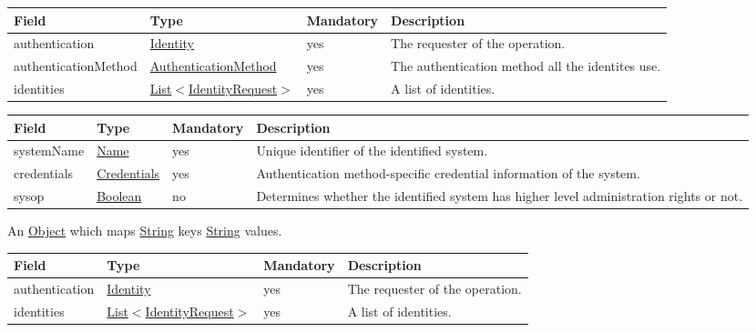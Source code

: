 \documentclass[a4paper]{arrowhead}
\newcommand{\pref}[1]{{\textcolor{ArrowheadGrey}{\hyperref[sec:model:primitives:#1]{#1}}}}
\begin{document}
\begin{table}[ht!]
\begin{tabularx}{\textwidth}{| p{3.3cm} | p{3.4cm} | p{2cm} | X |} \hline
\rowcolor{gray!33} Field & Type & Mandatory & Description \\ \hline
authentication & \hyperref[sec:model:Identity]{Identity} & yes & The requester of the operation. \\ \hline
authenticationMethod & \pref{AuthenticationMethod} & yes & The authentication method all the identites use. \\ \hline
identities & \pref{List}$<$\hyperref[sec:model:IdentityRequest]{IdentityRequest}$>$ & yes & A list of identities. \\ \hline
\end{tabularx}
\end{table}

\clearpage

 
\begin{table}[ht!]
\begin{tabularx}{\textwidth}{| p{2.5cm} | p{2.5cm} | p{2cm} | X |} \hline
\rowcolor{gray!33} Field & Type & Mandatory & Description \\ \hline
systemName & \pref{Name} & yes & Unique identifier of the identified system. \\ \hline
credentials &\hyperref[sec:model:Credentials]{Credentials} & yes & Authentication method-specific credential information of the system. \\ \hline
sysop & \pref{Boolean} & no & Determines whether the identified system has higher level administration rights or not. \\ \hline
\end{tabularx}
\end{table}


An \pref{Object} which maps \pref{String} keys \pref{String} values.

 
\begin{table}[ht!]
\begin{tabularx}{\textwidth}{| p{3.3cm} | p{3.4cm} | p{2cm} | X |} \hline
\rowcolor{gray!33} Field & Type & Mandatory & Description \\ \hline
authentication & \hyperref[sec:model:Identity]{Identity} & yes & The requester of the operation. \\ \hline
identities & \pref{List}$<$\hyperref[sec:model:IdentityRequest]{IdentityRequest}$>$ & yes & A list of identities. \\ \hline
\end{tabularx}
\end{table}
\end{document}
